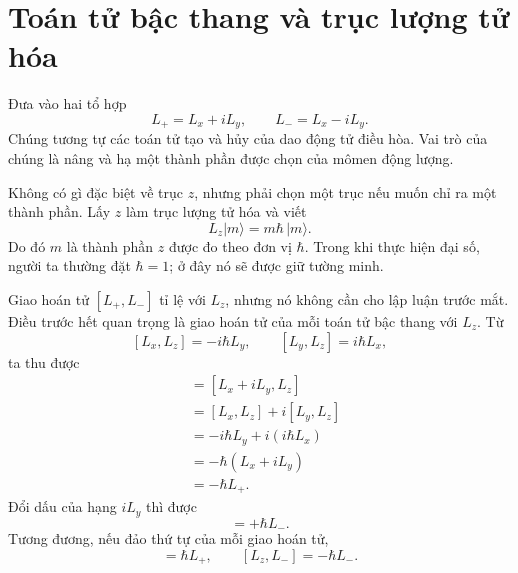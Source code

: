 \begin{classroomqa}
\end{classroomqa}

\section{Toán tử bậc thang và trục lượng tử hóa}

Đưa vào hai tổ hợp
\begin{equation}
L_+=L_x+iL_y,
\qquad
L_-=L_x-iL_y.
\end{equation}
Chúng tương tự các toán tử tạo và hủy của dao động tử điều hòa. Vai trò của chúng là nâng và hạ một thành phần được chọn của mômen động lượng.

Không có gì đặc biệt về trục \(z\), nhưng phải chọn một trục nếu muốn chỉ ra một thành phần. Lấy \(z\) làm trục lượng tử hóa và viết
\begin{equation}
L_z\lvert m\rangle=m\hbar\,\lvert m\rangle.
\end{equation}
Do đó \(m\) là thành phần \(z\) được đo theo đơn vị \(\hbar\). Trong khi thực hiện đại số, người ta thường đặt \(\hbar=1\); ở đây nó sẽ được giữ tường minh.

Giao hoán tử \([L_+,L_-]\) tỉ lệ với \(L_z\), nhưng nó không cần cho lập luận trước mắt. Điều trước hết quan trọng là giao hoán tử của mỗi toán tử bậc thang với \(L_z\). Từ
\[
[L_x,L_z]=-i\hbar L_y,
\qquad
[L_y,L_z]=i\hbar L_x,
\]
ta thu được
\begin{align}
[L_+,L_z]
&=[L_x+iL_y,L_z] \\
&=[L_x,L_z]+i[L_y,L_z] \\
&=-i\hbar L_y+i(i\hbar L_x) \\
&=-\hbar(L_x+iL_y) \\
&=-\hbar L_+.
\end{align}
Đổi dấu của hạng \(iL_y\) thì được
\begin{equation}
[L_-,L_z]=+\hbar L_-.
\end{equation}
Tương đương, nếu đảo thứ tự của mỗi giao hoán tử,
\begin{equation}
[L_z,L_+]=\hbar L_+,
\qquad
[L_z,L_-]=-\hbar L_-.
\end{equation}

